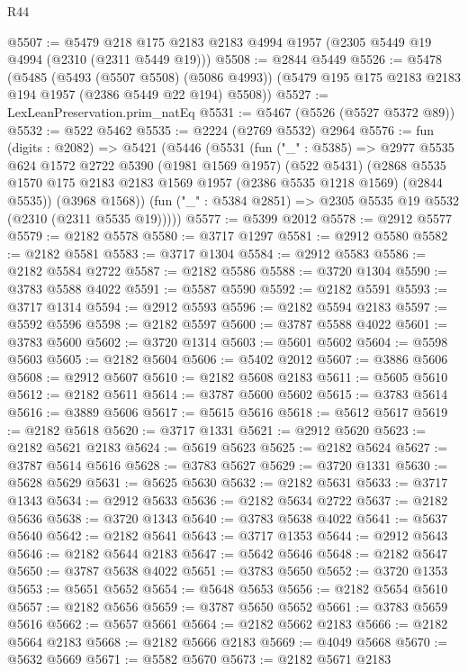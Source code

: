 \begin{lexlean}{R44}
\begin{coremodule}
@5507 := @5479 @218 @175 @2183 @2183 @4994 @1957 (@2305 @5449 @19 @4994 (@2310 (@2311 @5449 @19)))
@5508 := @2844 @5449
@5526 := @5478
    (@5485
      (@5493 (@5507 @5508) (@5086 @4993))
      (@5479 @195 @175 @2183 @2183 @194 @1957 (@2386 @5449 @22 @194) @5508))
@5527 := LexLeanPreservation.prim_natEq
@5531 := @5467 (@5526 (@5527 @5372 @89))
@5532 := @522 @5462
@5535 := @2224 (@2769 @5532) @2964
@5576 := fun (digits : @2082) =>
  @5421
    (@5446
      (@5531
        (fun ("_" : @5385) =>
        @2977
          @5535
          @624
          @1572
          @2722
          @5390
          (@1981 @1569 @1957)
          (@522 @5431)
          (@2868 @5535 @1570 @175 @2183 @2183 @1569 @1957 (@2386 @5535 @1218 @1569) (@2844 @5535))
          (@3968 @1568))
        (fun ("_" : @5384 @2851) => @2305 @5535 @19 @5532 (@2310 (@2311 @5535 @19)))))
@5577 := @5399 @2012
@5578 := @2912 @5577
@5579 := @2182 @5578
@5580 := @3717 @1297
@5581 := @2912 @5580
@5582 := @2182 @5581
@5583 := @3717 @1304
@5584 := @2912 @5583
@5586 := @2182 @5584 @2722
@5587 := @2182 @5586
@5588 := @3720 @1304
@5590 := @3783 @5588 @4022
@5591 := @5587 @5590
@5592 := @2182 @5591
@5593 := @3717 @1314
@5594 := @2912 @5593
@5596 := @2182 @5594 @2183
@5597 := @5592 @5596
@5598 := @2182 @5597
@5600 := @3787 @5588 @4022
@5601 := @3783 @5600
@5602 := @3720 @1314
@5603 := @5601 @5602
@5604 := @5598 @5603
@5605 := @2182 @5604
@5606 := @5402 @2012
@5607 := @3886 @5606
@5608 := @2912 @5607
@5610 := @2182 @5608 @2183
@5611 := @5605 @5610
@5612 := @2182 @5611
@5614 := @3787 @5600 @5602
@5615 := @3783 @5614
@5616 := @3889 @5606
@5617 := @5615 @5616
@5618 := @5612 @5617
@5619 := @2182 @5618
@5620 := @3717 @1331
@5621 := @2912 @5620
@5623 := @2182 @5621 @2183
@5624 := @5619 @5623
@5625 := @2182 @5624
@5627 := @3787 @5614 @5616
@5628 := @3783 @5627
@5629 := @3720 @1331
@5630 := @5628 @5629
@5631 := @5625 @5630
@5632 := @2182 @5631
@5633 := @3717 @1343
@5634 := @2912 @5633
@5636 := @2182 @5634 @2722
@5637 := @2182 @5636
@5638 := @3720 @1343
@5640 := @3783 @5638 @4022
@5641 := @5637 @5640
@5642 := @2182 @5641
@5643 := @3717 @1353
@5644 := @2912 @5643
@5646 := @2182 @5644 @2183
@5647 := @5642 @5646
@5648 := @2182 @5647
@5650 := @3787 @5638 @4022
@5651 := @3783 @5650
@5652 := @3720 @1353
@5653 := @5651 @5652
@5654 := @5648 @5653
@5656 := @2182 @5654 @5610
@5657 := @2182 @5656
@5659 := @3787 @5650 @5652
@5661 := @3783 @5659 @5616
@5662 := @5657 @5661
@5664 := @2182 @5662 @2183
@5666 := @2182 @5664 @2183
@5668 := @2182 @5666 @2183
@5669 := @4049 @5668
@5670 := @5632 @5669
@5671 := @5582 @5670
@5673 := @2182 @5671 @2183

\end{coremodule}
\end{lexlean}

